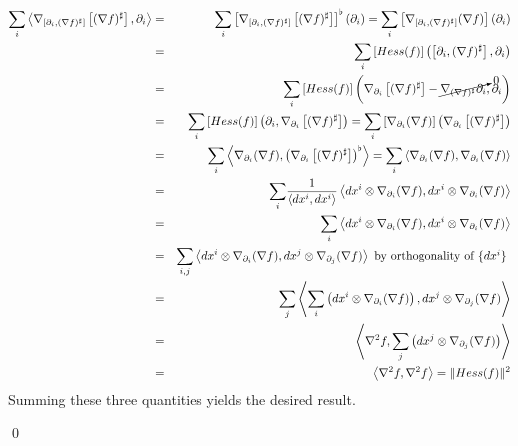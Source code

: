 \documentclass{article}
\newcommand{\proven}[0]{\begin{flushright} \qed \end{flushright}}
\begin{document}
\begin{eqnarray*}
\displaystyle{\sum_i} \left\langle \nabla _{\left[ \partial_i , (\nabla f) ^\sharp \right]} \left[  (\nabla f) ^\sharp \right] , \partial_i \right\rangle &
 = & \displaystyle{\sum_i} \left[ \nabla _{\left[ \partial_i , (\nabla f) ^\sharp \right]} \left[  (\nabla f) ^\sharp \right]\right]^\flat \left( \partial_i \right)
 = \displaystyle{\sum_i} \left[ \nabla _{\left[ \partial_i , (\nabla f) ^\sharp \right]} (\nabla f) \right] \left( \partial_i \right) \\
 & = & \displaystyle{\sum_i} \left[ Hess(f) \right] \left( \left[\partial_i , (\nabla f)^\sharp \right], \partial_i \right) \\
 & = & \displaystyle{\sum_i} \left[ Hess(f) \right] \left( \nabla_{\partial_i} \left[ (\nabla f)^\sharp \right] - \cancelto{0}{\nabla_{(\nabla f)^\sharp} \partial_i} , \partial_i \right) \\
 & = & \displaystyle{\sum_i} \left[ Hess(f) \right] \left(\partial_i ,  \nabla_{\partial_i} \left[ (\nabla f)^\sharp \right]\right)
 = \displaystyle{\sum_i} \left[ \nabla _{\partial_i} (\nabla f) \right] \left( \nabla_{\partial_i} \left[ (\nabla f)^\sharp \right] \right)\\
 & = & \displaystyle{\sum_i} \left\langle \nabla _{\partial_i} (\nabla f), \left( \nabla_{\partial_i} \left[ (\nabla f)^\sharp \right] \right)^\flat \right\rangle
 = \displaystyle{\sum_i} \left\langle \nabla _{\partial_i} (\nabla f),\nabla _{\partial_i} (\nabla f) \right\rangle \\
 & = & \displaystyle{\sum_i} \frac{1}{\left\langle dx^i, dx^i \right\rangle} \left\langle dx^i \otimes \nabla _{\partial_i} (\nabla f),dx^i \otimes  \nabla _{\partial_i} (\nabla f) \right\rangle \\
 & = & \displaystyle{\sum_i} \left\langle dx^i \otimes \nabla _{\partial_i} (\nabla f),dx^i \otimes  \nabla _{\partial_i} (\nabla f) \right\rangle \\
 & = & \displaystyle{\sum_{i,j}} \left\langle dx^i \otimes \nabla _{\partial_i} (\nabla f),dx^j \otimes  \nabla _{\partial_j} (\nabla f) \right\rangle \mbox{ by orthogonality of $\{ dx^i\}$ }\\
 & = & \displaystyle{\sum_{j}} \left\langle \displaystyle{\sum_{i}} \left( dx^i \otimes \nabla _{\partial_i} (\nabla f) \right),dx^j \otimes  \nabla _{\partial_j} (\nabla f) \right\rangle\\
 & = & \left\langle \displaystyle{\nabla ^2 f ,\displaystyle{\sum_{j}} \left(dx^j \otimes \nabla _{\partial_j} (\nabla f)\right)} \right\rangle \\
& = & \left\langle \nabla ^2 f, \nabla ^2 f \right\rangle = \| Hess(f) \| ^2
\end{eqnarray*}
Summing these three quantities yields the desired result.
\proven
\end{document}

